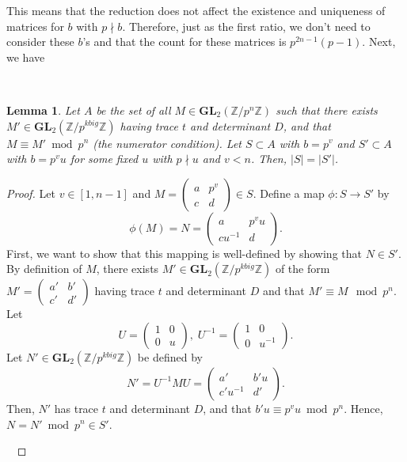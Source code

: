 \documentclass[letterpaper,12pt]{article}
\newtheorem{lemma}{Lemma}
\newcommand{\Z}{\mathbb{Z}}
\newcommand{\GL}{\mathbf {GL}}
\begin{document}
This means that the reduction does not affect the existence and uniqueness of matrices 
for $b$ with $p \nmid b$.
Therefore, just as the first ratio, we don't need to consider these $b$'s
and that the count for these matrices is $p^{2n-1}(p-1)$.
Next, we have

\

\begin{lemma}
Let $A$ be the set of all $M \in \GL_2(\Z/p^n\Z)$ 
such that there exists $M' \in \GL_2(\Z/p^{kbig}\Z)$ having 
trace $t$ and determinant $D$, and that $M \equiv M' \bmod p^n$
(the numerator condition).
Let $S \subset A$ with $b = p^v$ and
$S' \subset A$ with $b = p^vu$ for some fixed $u$ with $p \nmid u$
and $v < n$.
Then, $|S| = |S'|$.
\end{lemma}


\begin{proof}
Let $v \in [1, n-1]$ and $M = \begin{pmatrix}
a & p^v \\ c & d
\end{pmatrix} \in S$.
Define a map $\phi: S \to S'$ by 
\[
\phi(M) = N = \begin{pmatrix}
a & p^vu \\ cu^{-1} & d
\end{pmatrix}.
\]
First, we want to show that this mapping is well-defined 
by showing that $N \in S'$.
By definition of $M$, there exists $M' \in \GL_2(\Z/p^{kbig}\Z)$
of the form $M' = \begin{pmatrix}
a' & b' \\ c' & d'
\end{pmatrix}$ having trace $t$ and determinant $D$ and
that $M' \equiv M \mod p^n$.
Let 
\[
U = \begin{pmatrix}
1 & 0 \\ 0 & u
\end{pmatrix}, \;
U^{-1} = \begin{pmatrix}
1 & 0 \\ 0 & u^{-1}
\end{pmatrix}.
\]
Let $N' \in \GL_2(\Z/p^{kbig}\Z)$ be defined by 
\[
N' = U^{-1}MU 
= \begin{pmatrix}
a' & b'u \\ c'u^{-1} & d'
\end{pmatrix}.
\]
Then, $N'$ has trace $t$ and determinant $D$, and that 
$b'u \equiv p^v u \bmod p^n$.
Hence, $N = N' \bmod p^n \in S'$.

\


\end{proof}
\end{document}
